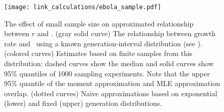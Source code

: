 \begin{figure}[htbp] \centering
	\texttt{[image: link\_calculations/ebola\_sample.pdf]}
\caption{
%
The effect of small sample size on approximated relationship between $r$ and \RR.
(gray solid curve) The relationship between growth rate and \RR~using a known generation-interval distribution (see ).
(colored curves) Estimates based on finite samples from this distribution: dashed curves show the median and solid curves show 95\% quantiles of 1000 sampling experiments.
Note that the upper 95\% quantile of the moment approximation and MLE approximation overlap.
(dotted curves) Naive approximations based on exponential (lower) and fixed (upper) generation distributions.
%
}
	\label{fig:ebolaSample}
\end{figure}
